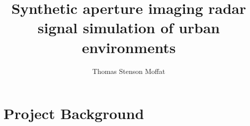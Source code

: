 \documentclass[11pt]{report}
\title{Synthetic aperture imaging radar signal simulation of urban environments}
\author{Thomas Stenson Moffat}
\begin{document}

\addtocounter{chapter}{1}
\chapter{Project Background}


	
	\printbibliography
\end{document}
